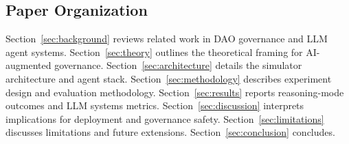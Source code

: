 \subsection{Paper Organization}

Section~\ref{sec:background} reviews related work in DAO governance and LLM agent systems.
Section~\ref{sec:theory} outlines the theoretical framing for AI-augmented governance.
Section~\ref{sec:architecture} details the simulator architecture and agent stack.
Section~\ref{sec:methodology} describes experiment design and evaluation methodology.
Section~\ref{sec:results} reports reasoning-mode outcomes and LLM systems metrics.
Section~\ref{sec:discussion} interprets implications for deployment and governance safety.
Section~\ref{sec:limitations} discusses limitations and future extensions.
Section~\ref{sec:conclusion} concludes.

